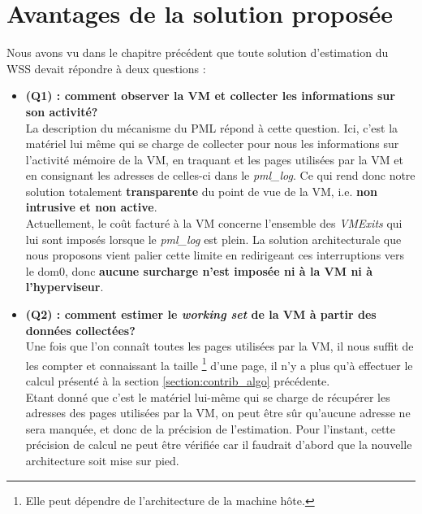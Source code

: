 \section{Avantages de la solution proposée}
Nous avons vu dans le chapitre précédent que toute solution d'estimation du WSS devait répondre à deux questions : 
\begin{itemize}
    \item \textbf{(Q1) : comment observer la VM et collecter les informations sur son \break activité?}\\
    La description du mécanisme du PML répond à cette question. Ici, c'est la matériel lui même qui se charge de collecter pour nous les informations sur l'activité mémoire de la VM, en traquant et les pages utilisées par la VM et en consignant les adresses de celles-ci dans le \textit{pml\_log}. Ce qui rend donc notre solution totalement \textbf{transparente} du point de vue de la VM, i.e. \textbf{non intrusive et non active}.\\
    Actuellement, le coût facturé à la VM concerne l'ensemble des \textit{VMExits} qui lui sont imposés lorsque le \textit{pml\_log} est plein. La solution architecturale que nous proposons vient palier cette limite en redirigeant ces interruptions vers le dom0, donc \textbf{aucune surcharge n'est imposée ni à la VM ni à l'hyperviseur}.
    
    \item \textbf{(Q2) : comment estimer le \textit{working set} de la VM à partir des données collectées?}\\
    Une fois que l'on connaît toutes les pages utilisées par la VM, il nous suffit de les compter et connaissant la taille \footnote{Elle peut dépendre de l'architecture de la machine hôte.} d'une page, il n'y a plus qu'à effectuer le calcul présenté à la section \ref{section:contrib_algo} précédente.\\
    Etant donné que c'est le matériel lui-même qui se charge de récupérer les adresses des pages utilisées par la VM, on peut être sûr qu'aucune adresse ne sera manquée, et donc de la précision de l'estimation. Pour l'instant, cette précision de calcul ne peut être vérifiée car il faudrait d'abord que la nouvelle architecture soit mise sur pied.
\end{itemize}
